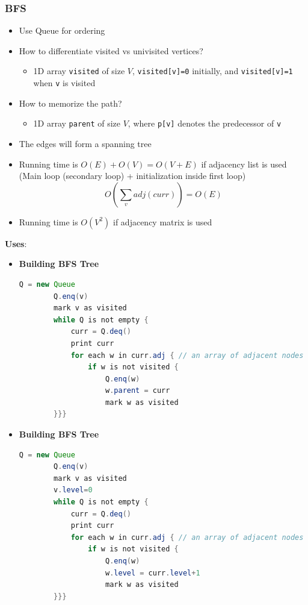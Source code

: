\documentclass{article}
\begin{document}
\begin{multicols}{2}
\subsubsection{BFS}
\begin{itemize}
	\item Use Queue for ordering
	\item How to differentiate visited vs univisited vertices?
	\begin{itemize}
		\item 1D array \texttt{visited} of size $V$, \texttt{visited[v]=0} initially, and \texttt{visited[v]=1} when \texttt{v} is visited
	\end{itemize}
    \item How to memorize the path?
    \begin{itemize}
    	\item 1D array \texttt{parent} of size $V$, where \texttt{p[v]} denotes the predecessor of \texttt{v}
    \end{itemize}
    \item The edges will form a spanning tree
    \item Running time is $O(E) + O(V) = O(V+E)$ if adjacency list is used (Main loop (secondary loop) + initialization inside first loop)
    $$O(\sum_{v}adj(curr)) = O(E)$$
    \item Running time is $O(V^2)$ if adjacency matrix is used
\end{itemize}
\textbf{Uses}:
\begin{itemize}
	\item \textbf{Building BFS Tree}
	\begin{lstlisting}[language=Java]
		Q = new Queue
		Q.enq(v)
		mark v as visited
		while Q is not empty {
			curr = Q.deq()
			print curr
			for each w in curr.adj { // an array of adjacent nodes
				if w is not visited {
					Q.enq(w)
					w.parent = curr
					mark w as visited
		}}}
\end{lstlisting}
    \item \textbf{Building BFS Tree}
    \begin{lstlisting}[language=Java]
    	Q = new Queue
    	Q.enq(v)
    	mark v as visited
    	v.level=0
    	while Q is not empty {
    		curr = Q.deq()
    		print curr
    		for each w in curr.adj { // an array of adjacent nodes
    			if w is not visited {
    				Q.enq(w)
    				w.level = curr.level+1
    				mark w as visited
    	}}}
\end{lstlisting}
\end{itemize}



\end{multicols}
\end{document}
